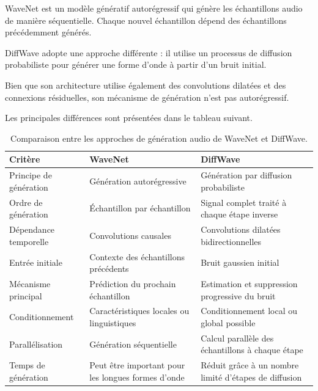 WaveNet est un modèle génératif autorégressif qui
génère les échantillons audio de manière séquentielle.
Chaque nouvel échantillon dépend des échantillons
précédemment générés.

DiffWave adopte une approche différente : il utilise
un processus de diffusion probabiliste pour générer
une forme d'onde à partir d'un bruit initial.

Bien que son architecture utilise également des
convolutions dilatées et des connexions résiduelles,
son mécanisme de génération n'est pas autorégressif.

Les principales différences sont présentées dans
le tableau suivant.

\begin{table}[H]
\centering
\renewcommand{\arraystretch}{1.5}
\begin{tabular}{|p{3.1cm}|p{5.1cm}|p{5.1cm}|}
\hline
\textbf{Critère} &
\textbf{WaveNet} &
\textbf{DiffWave} \\
\hline

Principe de génération &
Génération autorégressive &
Génération par diffusion probabiliste \\
\hline

Ordre de génération &
Échantillon par échantillon &
Signal complet traité à chaque étape inverse \\
\hline

Dépendance temporelle &
Convolutions causales &
Convolutions dilatées bidirectionnelles \\
\hline

Entrée initiale &
Contexte des échantillons précédents &
Bruit gaussien initial \\
\hline

Mécanisme principal &
Prédiction du prochain échantillon &
Estimation et suppression progressive du bruit \\
\hline

Conditionnement &
Caractéristiques locales ou linguistiques &
Conditionnement local ou global possible \\
\hline

Parallélisation &
Génération séquentielle &
Calcul parallèle des échantillons à chaque étape \\
\hline

Temps de génération &
Peut être important pour les longues formes d'onde &
Réduit grâce à un nombre limité d'étapes de diffusion \\
\hline
\end{tabular}
\caption{Comparaison entre les approches de génération
audio de WaveNet et DiffWave.}
\label{tab:diffwave_wavenet}
\end{table}

